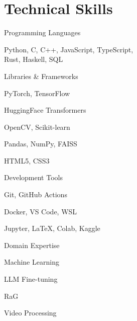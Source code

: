\documentclass[10pt, letterpaper]{article}
\begin{document}
\section{Technical Skills}
\begin{minipage}{\linewidth}
\begin{multicols}{2}
    \begin{skillsection}{Programming Languages}
        \item \begin{minipage}[t]{\linewidth}
                Python, C, C++, JavaScript, TypeScript, \\ Rust, Haskell, SQL
              \end{minipage}
    \end{skillsection}
    
    \vspace{\medskipamount}

    \begin{skillsection}{Libraries \& Frameworks}
        \item PyTorch, TensorFlow
        \item HuggingFace Transformers
        \item OpenCV, Scikit-learn
        \item Pandas, NumPy, FAISS
        \item HTML5, CSS3
    \end{skillsection}

    \columnbreak

    \begin{skillsection}{Development Tools}
        \item Git, GitHub Actions
        \item Docker, VS Code, WSL
        \item Jupyter, LaTeX, Colab, Kaggle
    \end{skillsection}
    
    \vspace{\medskipamount}

    \begin{skillsection}{Domain Expertise}
        \item Machine Learning
        \item LLM Fine-tuning
        \item RaG
        \item Video Processing
    \end{skillsection}
\end{multicols}
\end{minipage}
\end{document}
